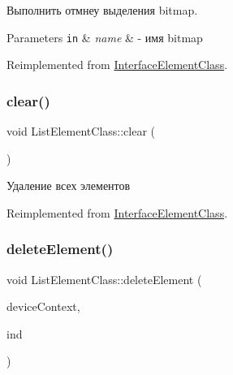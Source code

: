 Выполнить отмнеу выделения bitmap. 


\begin{DoxyParams}[1]{Parameters}
\mbox{\tt in}  & {\em name} & -\/ имя bitmap \\
\hline
\end{DoxyParams}


Reimplemented from \hyperlink{class_interface_element_class_a906729d7cf4a4db85520c8e516007685}{Interface\+Element\+Class}.

\mbox{\label{class_list_element_class_a3c18a56481ec0a07b834eeccf111ea95}} 
\subsubsection{\texorpdfstring{clear()}{clear()}}
{\footnotesize\ttfamily void List\+Element\+Class\+::clear (\begin{DoxyParamCaption}{ }\end{DoxyParamCaption})\hspace{0.3cm}{\ttfamily [virtual]}}



Удаление всех элементов 



Reimplemented from \hyperlink{class_interface_element_class_a0bc6d608e1d1c6bebb6507b7f9a8a220}{Interface\+Element\+Class}.

\mbox{\label{class_list_element_class_a5cef68e71760862404d66baf55e526af}} 
\subsubsection{\texorpdfstring{delete\+Element()}{deleteElement()}}
{\footnotesize\ttfamily void List\+Element\+Class\+::delete\+Element (\begin{DoxyParamCaption}\item[{I\+D3\+D11\+Device\+Context $\ast$}]{device\+Context,  }\item[{int}]{ind }\end{DoxyParamCaption})\hspace{0.3cm}{\ttfamily [virtual]}}



